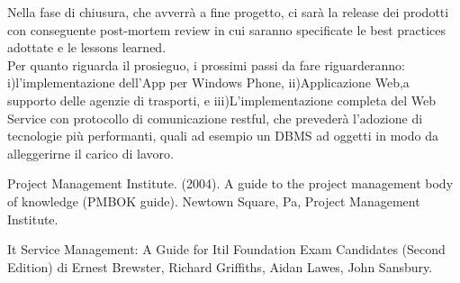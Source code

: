 \documentclass[conference]{IEEEtran}
\begin{document}
Nella fase di chiusura, che avverr\`{a} a fine progetto, ci sar\`{a} la release dei prodotti con conseguente post-mortem review in cui saranno specificate le best practices adottate e le lessons learned.\\
Per quanto riguarda il prosieguo, i prossimi passi da fare riguarderanno: i)l\rq implementazione dell\rq App per Windows Phone, ii)Applicazione Web,a supporto delle agenzie di trasporti, e iii)L\rq implementazione completa del Web Service con protocollo di comunicazione restful, che preveder\`{a} l\rq adozione di tecnologie pi\`{u} performanti, quali ad esempio un DBMS ad oggetti in modo da alleggerirne il carico di lavoro.




\begin{thebibliography}{1}

Project Management Institute. (2004). A guide to the project management body of knowledge (PMBOK guide). Newtown Square, Pa, Project Management Institute.

It Service Management: A Guide for Itil Foundation Exam Candidates (Second Edition) di Ernest Brewster, Richard Griffiths, Aidan Lawes, John Sansbury.


\end{thebibliography}




\end{document}
